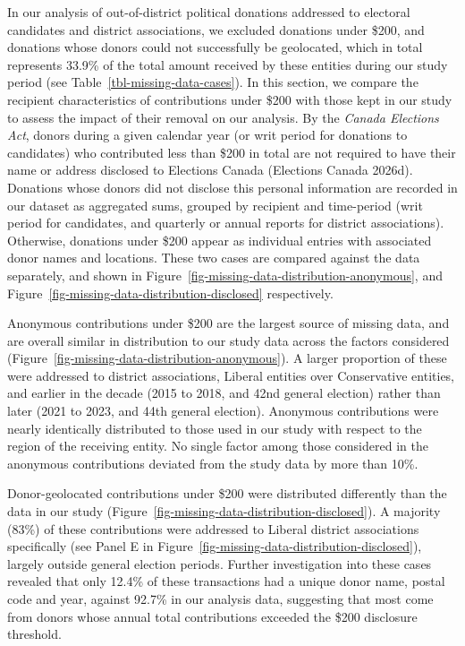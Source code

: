 \documentclass[
  letterpaper,
  DIV=11,
  numbers=noendperiod]{scrartcl}
\begin{document}
In our analysis of out-of-district political donations addressed to
electoral candidates and district associations, we excluded donations
under \$200, and donations whose donors could not successfully be
geolocated, which in total represents 33.9\% of the total amount
received by these entities during our study period (see
Table~\ref{tbl-missing-data-cases}). In this section, we compare the
recipient characteristics of contributions under \$200 with those kept
in our study to assess the impact of their removal on our analysis. By
the \emph{Canada Elections Act}, donors during a given calendar year (or
writ period for donations to candidates) who contributed less than \$200
in total are not required to have their name or address disclosed to
Elections Canada (Elections Canada 2026d). Donations whose donors did
not disclose this personal information are recorded in our dataset as
aggregated sums, grouped by recipient and time-period (writ period for
candidates, and quarterly or annual reports for district associations).
Otherwise, donations under \$200 appear as individual entries with
associated donor names and locations. These two cases are compared
against the data separately, and shown in
Figure~\ref{fig-missing-data-distribution-anonymous}, and
Figure~\ref{fig-missing-data-distribution-disclosed} respectively.

Anonymous contributions under \$200 are the largest source of missing
data, and are overall similar in distribution to our study data across
the factors considered
(Figure~\ref{fig-missing-data-distribution-anonymous}). A larger
proportion of these were addressed to district associations, Liberal
entities over Conservative entities, and earlier in the decade (2015 to
2018, and 42nd general election) rather than later (2021 to 2023, and
44th general election). Anonymous contributions were nearly identically
distributed to those used in our study with respect to the region of the
receiving entity. No single factor among those considered in the
anonymous contributions deviated from the study data by more than 10\%.

Donor-geolocated contributions under \$200 were distributed differently
than the data in our study
(Figure~\ref{fig-missing-data-distribution-disclosed}). A majority
(83\%) of these contributions were addressed to Liberal district
associations specifically (see Panel E in
Figure~\ref{fig-missing-data-distribution-disclosed}), largely outside
general election periods. Further investigation into these cases
revealed that only 12.4\% of these transactions had a unique donor name,
postal code and year, against 92.7\% in our analysis data, suggesting
that most come from donors whose annual total contributions exceeded the
\$200 disclosure threshold.
\end{document}
